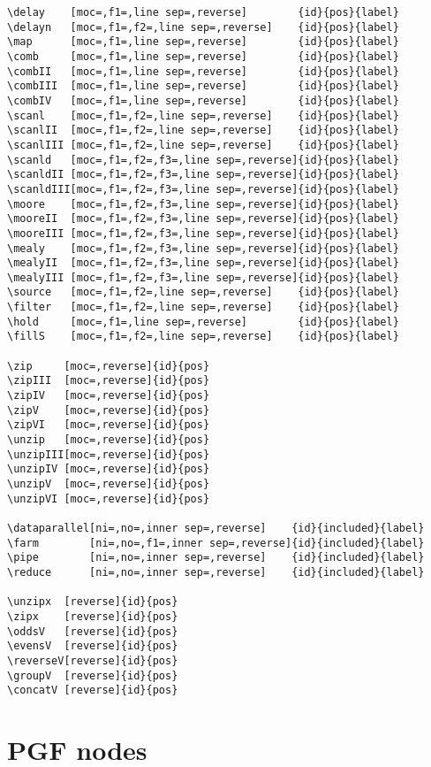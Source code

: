 \documentclass[10pt]{article}
\begin{document}
\begin{verbatim}
\delay    [moc=,f1=,line sep=,reverse]        {id}{pos}{label}
\delayn   [moc=,f1=,f2=,line sep=,reverse]    {id}{pos}{label}
\map      [moc=,f1=,line sep=,reverse]        {id}{pos}{label}
\comb     [moc=,f1=,line sep=,reverse]        {id}{pos}{label}
\combII   [moc=,f1=,line sep=,reverse]        {id}{pos}{label}
\combIII  [moc=,f1=,line sep=,reverse]        {id}{pos}{label}
\combIV   [moc=,f1=,line sep=,reverse]        {id}{pos}{label}
\scanl    [moc=,f1=,f2=,line sep=,reverse]    {id}{pos}{label}
\scanlII  [moc=,f1=,f2=,line sep=,reverse]    {id}{pos}{label}
\scanlIII [moc=,f1=,f2=,line sep=,reverse]    {id}{pos}{label}
\scanld   [moc=,f1=,f2=,f3=,line sep=,reverse]{id}{pos}{label}
\scanldII [moc=,f1=,f2=,f3=,line sep=,reverse]{id}{pos}{label}
\scanldIII[moc=,f1=,f2=,f3=,line sep=,reverse]{id}{pos}{label}
\moore    [moc=,f1=,f2=,f3=,line sep=,reverse]{id}{pos}{label}
\mooreII  [moc=,f1=,f2=,f3=,line sep=,reverse]{id}{pos}{label}
\mooreIII [moc=,f1=,f2=,f3=,line sep=,reverse]{id}{pos}{label}
\mealy    [moc=,f1=,f2=,f3=,line sep=,reverse]{id}{pos}{label}
\mealyII  [moc=,f1=,f2=,f3=,line sep=,reverse]{id}{pos}{label}
\mealyIII [moc=,f1=,f2=,f3=,line sep=,reverse]{id}{pos}{label}
\source   [moc=,f1=,f2=,line sep=,reverse]    {id}{pos}{label}
\filter   [moc=,f1=,f2=,line sep=,reverse]    {id}{pos}{label}
\hold     [moc=,f1=,line sep=,reverse]        {id}{pos}{label}
\fillS    [moc=,f1=,f2=,line sep=,reverse]    {id}{pos}{label}

\zip     [moc=,reverse]{id}{pos}
\zipIII  [moc=,reverse]{id}{pos}
\zipIV   [moc=,reverse]{id}{pos}
\zipV    [moc=,reverse]{id}{pos}
\zipVI   [moc=,reverse]{id}{pos}
\unzip   [moc=,reverse]{id}{pos}
\unzipIII[moc=,reverse]{id}{pos}
\unzipIV [moc=,reverse]{id}{pos}
\unzipV  [moc=,reverse]{id}{pos}
\unzipVI [moc=,reverse]{id}{pos}

\dataparallel[ni=,no=,inner sep=,reverse]    {id}{included}{label}
\farm        [ni=,no=,f1=,inner sep=,reverse]{id}{included}{label}
\pipe        [ni=,no=,inner sep=,reverse]    {id}{included}{label}
\reduce      [ni=,no=,inner sep=,reverse]    {id}{included}{label}

\unzipx  [reverse]{id}{pos}
\zipx    [reverse]{id}{pos}
\oddsV   [reverse]{id}{pos}
\evensV  [reverse]{id}{pos}
\reverseV[reverse]{id}{pos}
\groupV  [reverse]{id}{pos}
\concatV [reverse]{id}{pos}

\end{verbatim}


\newpage
\appendix
\section{PGF nodes} \label{appendix_shapes}
\end{document}
